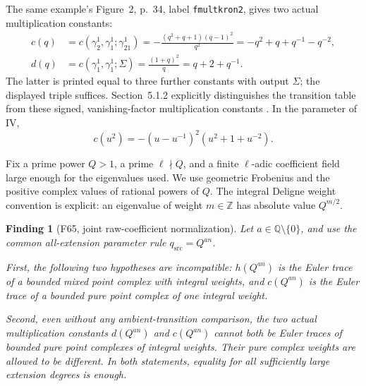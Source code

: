 \documentclass[11pt,a4paper]{article}
\newcommand{\fid}[1]{\textsf{#1}}\newcommand{\gate}[1]{\textsf{#1}}
\theoremstyle{named}\newtheorem{finding}{Finding}[section]
\theoremstyle{definition}\newtheorem{definition}[finding]{Definition}
\theoremstyle{remark}\newtheorem{remark}[finding]{Remark}
\begin{document}
The same example's Figure~2, p.~34, label
\texttt{fmultkron2}, gives two actual multiplication constants:
\begin{align}
 c(q)&=c(\gamma_2^1,\gamma_1^1;\gamma_{21}^1)
   =-\frac{(q^2+q+1)(q-1)^2}{q^2}
   =-q^2+q+q^{-1}-q^{-2},
   \label{eq:jointNegativeCoefficient}\\
 d(q)&=c(\gamma_1^1,\gamma_1^1;\Sigma)
   =\frac{(1+q)^2}{q}
   =q+2+q^{-1}.
   \label{eq:jointPositiveCoefficient}
\end{align}
The latter is printed equal to three further constants
with output \(\Sigma\); the displayed triple suffices.
Section~5.1.2 explicitly distinguishes the transition
table from these signed, vanishing-factor multiplication
constants \cite{VIII}.
In the parameter of IV,
\[
                c(u^2)=-(u-u^{-1})^2(u^2+1+u^{-2}).
\]

Fix a prime power \(Q>1\), a prime \(\ell\nmid Q\),
and a finite \(\ell\)-adic coefficient field large enough
for the eigenvalues used. We use geometric Frobenius
and the positive complex values of rational powers of \(Q\).
The integral Deligne weight convention is explicit:
an eigenvalue of weight \(m\in\mathbb Z\) has absolute
value \(Q^{m/2}\).

\begin{finding}[\fid{F65}, joint raw-coefficient normalization]
\label{f:jointRawCoefficientNormalization}
Let \(a\in\mathbb Q\setminus\{0\}\), and use the common
all-extension parameter rule \(q_{\mathrm{src}}=Q^{an}\).

First, the following two hypotheses are incompatible:
\(h(Q^{an})\) is the Euler trace of a bounded mixed point
complex with integral weights, and \(c(Q^{an})\) is
the Euler trace of a bounded pure point complex of one
integral weight.

Second, even without any ambient-transition comparison,
the two actual multiplication constants
\(d(Q^{an})\) and \(c(Q^{an})\) cannot both be Euler
traces of bounded pure point complexes of integral weights.
Their pure complex weights are allowed to be different.
In both statements, equality for all sufficiently large
extension degrees is enough.
\end{finding}
\end{document}
